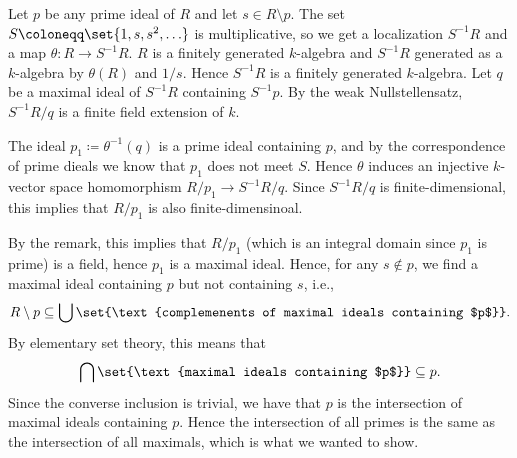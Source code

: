 Let $p$ be any prime ideal of $R$ and let $s \in R\setminus p$. The
set $S\coloneqq\set{1, s, s^2, \ldots}$ is multiplicative, so we get
a localization $S^{-1}R$ and a map $\theta\colon R\to S^{-1}R$.
$R$ is a finitely generated $k$-algebra and $S^{-1}R$ generated as a
$k$-algebra by $\theta(R)$ and $1/s$. Hence $S^{-1}R$ is a finitely generated
$k$-algebra. Let $q$ be a maximal ideal of $S^{-1}R$ containing $S^{-1}p$. By
the weak Nullstellensatz,  $S^{-1}R/q$ is a finite field extension of $k$.

The ideal  $p_1\coloneqq \theta^{-1}(q)$ is a prime ideal containing $p$, and
by the correspondence of prime dieals we know that  $p_1$ does not meet $S$.
Hence $\theta$ induces an injective $k$-vector space homomorphism
$R/p_1\to S^{-1}R/q$. Since $S^{-1}R/q$ is finite-dimensional, this implies
that $R/p_1$ is also finite-dimensinoal.

By the remark, this implies that $R/p_1$ (which is an integral domain since
 $p_1$ is prime) is a field, hence $p_1$ is a maximal ideal. Hence, for any
 $s \notin p$, we find a maximal ideal containing $p$ but not containing $s$,
i.e.,
\[ R\setminus p \subseteq \bigcup \set{\text{complemenents of maximal ideals containing $p$}}. \]
By elementary set theory, this means that
\[ \bigcap\set{\text{maximal ideals containing $p$}} \subseteq p. \]
Since the converse inclusion is trivial, we have that $p$ is the intersection
of maximal ideals containing $p$. Hence the intersection of all primes is
the same as the intersection of all maximals, which is what we wanted to show.
